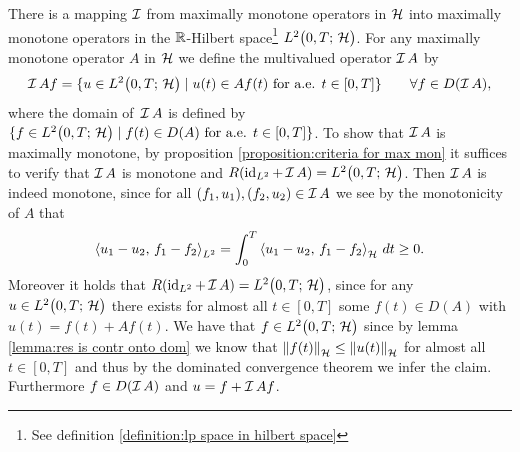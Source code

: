 \begin{example}\label{example:map max mon op from H to L2}
	There is a mapping 
	$ \operatorname{\mathcal{I}} $ from maximally monotone
	operators in $ \mathcal{H} $ into maximally monotone operators in the 
	$ \mathbb{R} $-Hilbert space\footnote{See definition 
	\ref{definition:lp space in hilbert space}} $ L^{2}\big(0,T;\,\mathcal{H}\big) $.
	For any maximally monotone operator $ A $ in $ \mathcal{H} $ we define
	the multivalued operator $ \operatorname{\mathcal{I}} A $ by
	\begin{align*}
		\operatorname{\mathcal{I}} Af=\{u\in L^{2}\big(0,T;\,\mathcal{H}\big) \;\vert\; u(t)\in Af(t)\text{ for a.e. }t\in [0,T]\}
		\qquad\forall f\in D(\operatorname{\mathcal{I}} A),
	\end{align*}
	where the domain of $ \,\operatorname{\mathcal{I}} A $ is defined by 
	$ \{f\in L^{2}\big(0,T;\,\mathcal{H}\big)\;\vert\; f(t)\in D(A)\text{ for a.e. }t\in [0,T] \}$. 
	To show that $ \operatorname{\mathcal{I}} A $ is maximally monotone,
	by proposition \ref{proposition:criteria for max mon}
	it suffices to verify that $ \operatorname{\mathcal{I}} A $
	is monotone and $ R(\operatorname{\mathrm{id}}_{L^2}+\operatorname{\mathcal{I}} A)=L^{2}\big(0,T;\,\mathcal{H}\big) $.
	Then $ \operatorname{\mathcal{I}} A $ is indeed monotone, since for all 
	$ (f_1, u_1),(f_2,u_2)\in\operatorname{\mathcal{I}} A $ we see
	by the monotonicity of $ A $ that
	\begin{align*}
		\left\langle u_1-u_2,\,f_1-f_2\right\rangle_{L^2}
		=\int_0^T
		\left\langle u_1-u_2,\,f_1-f_2\right\rangle_{\mathcal{H}}\,dt
		\geq 0.
	\end{align*}
	Moreover it holds that $ R(\operatorname{\mathrm{id}}_{L^2}+\operatorname{\mathcal{I}} A)=L^{2}\big(0,T;\,\mathcal{H}\big) $,
	since for any
	$ u\in L^{2}\big(0,T;\,\mathcal{H}\big) $ there exists for almost all $ t\in[0,T] $
	some $ f(t)\in D(A) $ with $ u(t)=f(t)+Af(t) $.
	We have that $ f\in L^{2}\big(0,T;\,\mathcal{H}\big) $ since
	by lemma \ref{lemma:res is contr onto dom} we know that
	$ \left\Vert f(t)\right\Vert_{\mathcal{H}}\leq \left\Vert u(t)\right\Vert_{\mathcal{H}} $ for almost all $ t\in[0,T] $
	and thus by the dominated convergence theorem we infer the claim. 
	Furthermore $ f\in D(\operatorname{\mathcal{I}} A) $ and
	$ u=f+\operatorname{\mathcal{I}} A f $.
\end{example}


